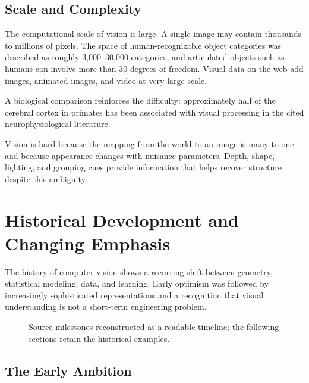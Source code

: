 \documentclass[11pt,a4paper,oneside]{report}
\begin{document}
\section{Scale and Complexity}
\enlargethispage{\baselineskip}

The computational scale of vision is large. A single image may contain thousands to millions of pixels. The space of human-recognizable object categories was described as roughly 3,000--30,000 categories, and articulated objects such as humans can involve more than 30 degrees of freedom. Visual data on the web add images, animated images, and video at very large scale.

A biological comparison reinforces the difficulty: approximately half of the cerebral cortex in primates has been associated with visual processing in the cited neurophysiological literature.

\FloatBarrier
\begin{chaptersummary}
Vision is hard because the mapping from the world to an image is many-to-one and because appearance changes with nuisance parameters. Depth, shape, lighting, and grouping cues provide information that helps recover structure despite this ambiguity.
\end{chaptersummary}

\chapter{Historical Development and Changing Emphasis}

The history of computer vision shows a recurring shift between geometry, statistical modeling, data, and learning. Early optimism was followed by increasingly sophisticated representations and a recognition that visual understanding is not a short-term engineering problem.

\begin{figure}[!htbp]
\centering

\caption{Source milestones reconstructed as a readable timeline; the following sections retain the historical examples.}
\label{fig:cv-history}
\end{figure}

\section{The Early Ambition}
\end{document}
